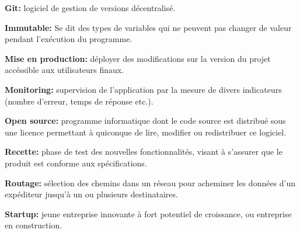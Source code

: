 \documentclass[12pt,a4paper]{article}
\begin{document}
  \bigskip

  \textbf{Git:} logiciel de gestion de versions décentralisé.

  \bigskip

  \textbf{Immutable:} Se dit des types de variables qui ne peuvent pas
  changer de valeur pendant l'exécution du programme.

  \bigskip

  \textbf{Mise en production:} déployer des modifications sur la version
  du projet accéssible aux utilisateurs finaux.

  \bigskip

  \textbf{Monitoring:} supervision de l'application par la mesure de
  divers indicateurs (nombre d'erreur, temps de réponse etc.).

  \bigskip

  \textbf{Open source:} programme informatique dont le code source est
  distribué sous une licence permettant à quiconque de lire, modifier ou
  redistribuer ce logiciel.

  \bigskip

  \textbf{Recette:} phase de test des nouvelles fonctionnalités, visant à
  s'assurer que le produit est conforme aux spécifications.

  \bigskip

  \textbf{Routage:} sélection des chemins dans un réseau pour acheminer
  les données d'un expéditeur jusqu'à un ou plusieurs destinataires.

  \bigskip

  \textbf{Startup:} jeune entreprise innovante à fort potentiel de
  croissance, ou entreprise en construction.



  \newpage

  \listoffigures
\end{document}
